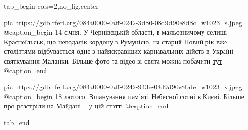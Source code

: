  
 
 
 
 

\ifcmt
  tab_begin cols=2,no_fig,center

     pic https://gdb.rferl.org/084a0000-0aff-0242-3d86-08d9d90e8d8c_w1023_s.jpeg
     @caption_begin
14 січня. У Чернівецькій області, в мальовничому селищі Красноїльськ, що
неподалік кордону з Румунією, на старий Новий рік вже століттями
відбувається одне з найяскравіших карнавальних дійств в Україні –
святкування Маланки. Більше фото та відео зі свята можна побачити 
\href{https://www.radiosvoboda.org/a/31048285.html}{тут} 
     @caption_end

     pic https://gdb.rferl.org/084a0000-0aff-0242-943e-08d9d90e8bde_w1023_s.jpeg
     @caption_begin
18 лютого. Вшанування пам'яті
\href{https://www.radiosvoboda.org/a/photo-nebesna-sotnya-vshanuvannya-kyiv/31109687.html}{Небесної
сотні} в Києві. Більше про розстріли на Майдані – у \href{https://www.radiosvoboda.org/a/dbr-i-henprokuror-pro-zavershennya-rozsliduvannya-rozstriliv-na-maydani/31564810.html}{цій статті}
     @caption_end

  tab_end
\fi
